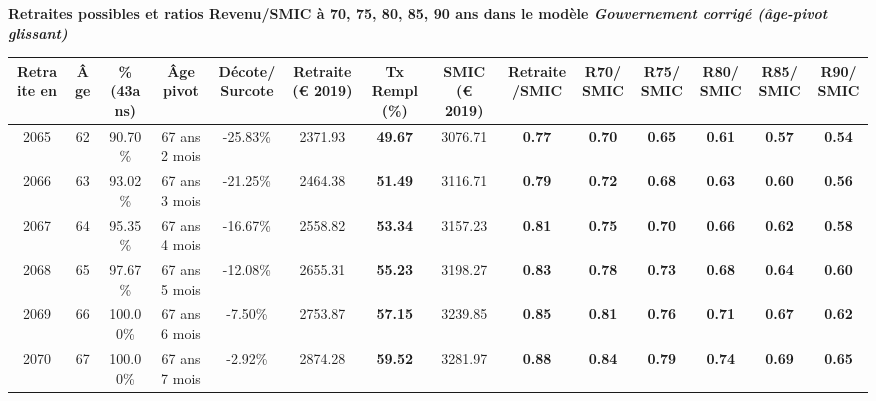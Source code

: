  \vspace{0.1cm} 
{\bf \noindent Retraites possibles et ratios Revenu/SMIC à 70, 75, 80, 85, 90 ans dans le modèle \emph{Gouvernement corrigé (âge-pivot glissant)}}  
 
\begin{adjustbox}{max width=\textwidth} 
\begin{tabular}[htb]{|c|c||c|c|c||c|c||c|c||c|c|c|c|c|} 
\hline 
 Retraite en &  Âge &  \%(43ans) &  Âge pivot &  Décote/Surcote &  Retraite (\euro{} 2019) &  Tx Rempl(\%) &  SMIC (\euro{} 2019) &  Retraite/SMIC &  R70/SMIC &  R75/SMIC &  R80/SMIC &  R85/SMIC &  R90/SMIC \\ 
\hline \hline 
 2065 &  62 &  90.70\% &  67 ans 2 mois &  -25.83\% &  2371.93 &  {\bf 49.67} &  3076.71 &  {\bf {\color{red} 0.77}} &  {\bf {\color{red} 0.70}} &  {\bf {\color{red} 0.65}} &  {\bf {\color{red} 0.61}} &  {\bf {\color{red} 0.57}} &  {\bf {\color{red} 0.54}} \\ 
\hline 
 2066 &  63 &  93.02\% &  67 ans 3 mois &  -21.25\% &  2464.38 &  {\bf 51.49} &  3116.71 &  {\bf {\color{red} 0.79}} &  {\bf {\color{red} 0.72}} &  {\bf {\color{red} 0.68}} &  {\bf {\color{red} 0.63}} &  {\bf {\color{red} 0.60}} &  {\bf {\color{red} 0.56}} \\ 
\hline 
 2067 &  64 &  95.35\% &  67 ans 4 mois &  -16.67\% &  2558.82 &  {\bf 53.34} &  3157.23 &  {\bf {\color{red} 0.81}} &  {\bf {\color{red} 0.75}} &  {\bf {\color{red} 0.70}} &  {\bf {\color{red} 0.66}} &  {\bf {\color{red} 0.62}} &  {\bf {\color{red} 0.58}} \\ 
\hline 
 2068 &  65 &  97.67\% &  67 ans 5 mois &  -12.08\% &  2655.31 &  {\bf 55.23} &  3198.27 &  {\bf {\color{red} 0.83}} &  {\bf {\color{red} 0.78}} &  {\bf {\color{red} 0.73}} &  {\bf {\color{red} 0.68}} &  {\bf {\color{red} 0.64}} &  {\bf {\color{red} 0.60}} \\ 
\hline 
 2069 &  66 &  100.00\% &  67 ans 6 mois &  -7.50\% &  2753.87 &  {\bf 57.15} &  3239.85 &  {\bf {\color{red} 0.85}} &  {\bf {\color{red} 0.81}} &  {\bf {\color{red} 0.76}} &  {\bf {\color{red} 0.71}} &  {\bf {\color{red} 0.67}} &  {\bf {\color{red} 0.62}} \\ 
\hline 
 2070 &  67 &  100.00\% &  67 ans 7 mois &  -2.92\% &  2874.28 &  {\bf 59.52} &  3281.97 &  {\bf {\color{red} 0.88}} &  {\bf {\color{red} 0.84}} &  {\bf {\color{red} 0.79}} &  {\bf {\color{red} 0.74}} &  {\bf {\color{red} 0.69}} &  {\bf {\color{red} 0.65}} \\ 
\hline 
\hline 
\end{tabular} 
\end{adjustbox} 
 
